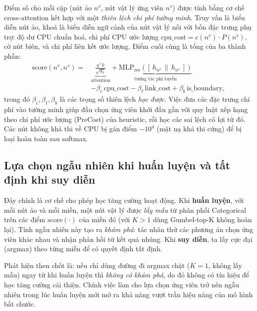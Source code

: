 \documentclass[../DoAn.tex]{subfiles}
\begin{document}
Điểm số cho mỗi cặp (nút ảo $n^v$, nút vật lý ứng viên $n^s$) được tính bằng cơ chế cross-attention kết hợp với một \textit{thiên lệch chi phí tường minh}. Truy vấn là biểu diễn nút ảo, khoá là biểu diễn ngữ cảnh của nút vật lý nối với bốn đặc trưng phụ trợ: độ dư CPU chuẩn hoá, chi phí CPU ước lượng $\mathrm{cpu\_cost}=c(n^v)\cdot P(n^s)$, cờ nút biên, và chi phí liên kết ước lượng. Điểm cuối cùng là tổng của ba thành phần:
\begin{equation}
\begin{split}
    \mathrm{score}(n^v, n^s) = {} & \underbrace{\frac{q^\top k}{\sqrt{d_h}}}_{\text{attention}} + \underbrace{\mathrm{MLP}_{\text{res}}([\,h_{n^v}\,\|\,h_{n^s}\,])}_{\text{tương tác phi tuyến}} \\
    & - \beta_c\,\mathrm{cpu\_cost} - \beta_\ell\,\mathrm{link\_cost} + \beta_b\,\mathrm{is\_boundary},
\end{split}
    \label{eq:cand-score}
\end{equation}
trong đó $\beta_c, \beta_\ell, \beta_b$ là các trọng số thiên lệch \textit{học được}. Việc đưa các đặc trưng chi phí vào tường minh giúp đầu chọn ứng viên khởi đầu gần với quy luật xếp hạng theo chi phí ước lượng (PreCost) của heuristic, rồi học các sai lệch có lợi từ đó. Các nút không khả thi về CPU bị gán điểm $-10^4$ (mặt nạ khả thi cứng) để bị loại hoàn toàn sau softmax.

\subsection{Lựa chọn ngẫu nhiên khi huấn luyện và tất định khi suy diễn}
\label{subsec:cand-sampling}

Đây chính là cơ chế cho phép học tăng cường hoạt động. Khi \textbf{huấn luyện}, với mỗi nút ảo và mỗi miền, một nút vật lý được \textit{lấy mẫu} từ phân phối Categorical trên các điểm $\mathrm{score}(\cdot)$ của miền đó (với $K{>}1$ dùng Gumbel-top-K không hoàn lại). Tính ngẫu nhiên này tạo ra \textit{khám phá}: tác nhân thử các phương án chọn ứng viên khác nhau và nhận phản hồi từ kết quả nhúng. Khi \textbf{suy diễn}, ta lấy cực đại (argmax) theo từng miền để có quyết định tất định.

Phát hiện then chốt là: nếu chỉ dùng đường đi argmax chặt ($K=1$, không lấy mẫu) ngay từ khi huấn luyện thì \textit{không có khám phá}, do đó không có tín hiệu để học tăng cường cải thiện. Chính việc làm cho lựa chọn ứng viên trở nên ngẫu nhiên trong lúc huấn luyện mới mở ra khả năng vượt trần hiệu năng của mô hình bắt chước.
\end{document}
